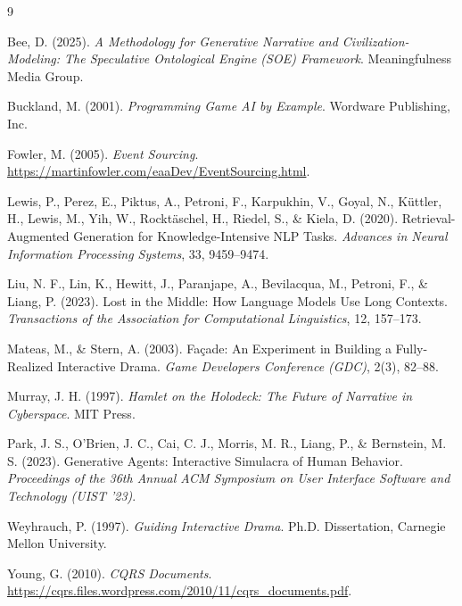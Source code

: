 \documentclass[12pt, a4paper]{article}
\begin{document}
\newpage

\begin{thebibliography}{9}

Bee, D. (2025). \textit{A Methodology for Generative Narrative and Civilization-Modeling: The Speculative Ontological Engine (SOE) Framework}. Meaningfulness Media Group.

Buckland, M. (2001). \textit{Programming Game AI by Example}. Wordware Publishing, Inc.

Fowler, M. (2005). \textit{Event Sourcing}. \url{https://martinfowler.com/eaaDev/EventSourcing.html}.

Lewis, P., Perez, E., Piktus, A., Petroni, F., Karpukhin, V., Goyal, N., Küttler, H., Lewis, M., Yih, W., Rocktäschel, H., Riedel, S., \& Kiela, D. (2020). Retrieval-Augmented Generation for Knowledge-Intensive NLP Tasks. \textit{Advances in Neural Information Processing Systems}, 33, 9459--9474.

Liu, N. F., Lin, K., Hewitt, J., Paranjape, A., Bevilacqua, M., Petroni, F., \& Liang, P. (2023). Lost in the Middle: How Language Models Use Long Contexts. \textit{Transactions of the Association for Computational Linguistics}, 12, 157--173.

Mateas, M., \& Stern, A. (2003). Façade: An Experiment in Building a Fully-Realized Interactive Drama. \textit{Game Developers Conference (GDC)}, 2(3), 82--88.

Murray, J. H. (1997). \textit{Hamlet on the Holodeck: The Future of Narrative in Cyberspace}. MIT Press.

Park, J. S., O'Brien, J. C., Cai, C. J., Morris, M. R., Liang, P., \& Bernstein, M. S. (2023). Generative Agents: Interactive Simulacra of Human Behavior. \textit{Proceedings of the 36th Annual ACM Symposium on User Interface Software and Technology (UIST '23)}.

Weyhrauch, P. (1997). \textit{Guiding Interactive Drama}. Ph.D. Dissertation, Carnegie Mellon University.

Young, G. (2010). \textit{CQRS Documents}. \url{https://cqrs.files.wordpress.com/2010/11/cqrs_documents.pdf}.

\end{thebibliography}
\end{document}
